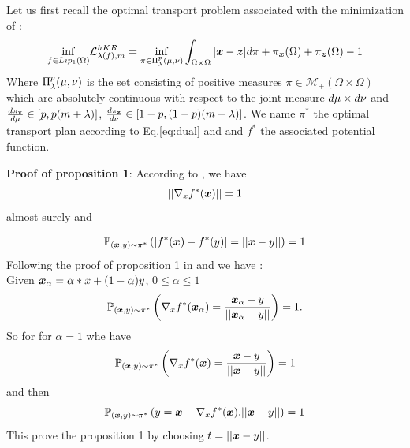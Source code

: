 Let us first recall the optimal transport problem associated with the minimization of \losshkr:
\begin{equation}\label{eq:dual}
\underset{f\in Lip_1(\Omega)} {\inf} \mathcal{L}^{hKR}_{\lambda(f),m} = \inf_{\pi \in\Pi^p_{\lambda}(\mu, \nu)}\int_{\Omega\times \Omega}|{\bm{x}}-{{\bm{z}}} |d\pi + \pi_{\bm{x}}(\Omega)+\pi_{{\bm{z}}}(\Omega)-1
\end{equation}
Where $\Pi^p_{\lambda}(\mu, \nu)$ is the set consisting of positive measures $\pi\in \mathcal{M}_+(\Omega\times \Omega)$ which  are absolutely continuous with respect to the joint measure $d\mu\times d\nu$ and $\frac{d\pi_{\textbf{x}}}{d\mu}\in [p, p(m+\lambda)]$, $\frac{d\pi_{{\textbf{z}}}}{d\nu}\in [1-p, (1-p)(m+\lambda)] $.
We name $\pi^*$  the optimal transport plan according to Eq.\ref{eq:dual} and and $f^*$ the associated potential function.

\textbf{Proof of proposition 1}:
According to \cite{serrurier2021achieving}, we have 
$$ ||\nabla_x f^*(\bm{x})||=1 $$
almost surely and

$$\mathbb{P}_{(\bm{x},y)\sim\pi^*} \left( |f^*(\bm{x}) - f^*(y)| = ||\bm{x} - y|| \right)=1$$
Following the proof of proposition 1 in \cite{gulrajani2017improved} and \cite{Ambrosio2003} we have :\\
Given $\bm{x}_\alpha = \alpha*x + (1-\alpha) y$, $0\leq\alpha\leq1$
$$ \mathbb{P}_{(\bm{x},y)\sim\pi^*} \left( \nabla_x f^*(\bm{x}_\alpha) =\frac{\bm{x}_\alpha - y}{ ||\bm{x}_\alpha - y||} \right)=1.$$
So for for $\alpha = 1$ whe have
$$ \mathbb{P}_{(\bm{x},y)\sim\pi^*} \left( \nabla_x f^*(\bm{x}) =\frac{\bm{x} - y}{ ||\bm{x} - y||} \right)=1$$
and then 
$$ \mathbb{P}_{(\bm{x},y)\sim\pi^*} \left( y = \bm{x} -  \nabla_x f^*(\bm{x}) .||\bm{x} - y|| \right)=1$$
This prove the proposition 1 by choosing $t=||\bm{x} - y||$.\BlackBox\\

